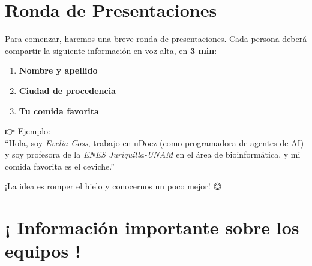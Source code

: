 \documentclass[
  spanish,
  12pt,
  letterpaper,
  DIV=11,
  numbers=noendperiod]{scrreprt}
\begin{document}
\section{Ronda de Presentaciones}\label{ronda-de-presentaciones}

\begin{tcolorbox}[enhanced jigsaw, arc=.35mm, bottomrule=.15mm, bottomtitle=1mm, breakable, colback=white, colbacktitle=quarto-callout-note-color!10!white, colframe=quarto-callout-note-color-frame, coltitle=black, left=2mm, leftrule=.75mm, opacityback=0, opacitybacktitle=0.6, rightrule=.15mm, title={Actividad: ¡Preséntate!}, titlerule=0mm, toprule=.15mm, toptitle=1mm]

Para comenzar, haremos una breve ronda de presentaciones. Cada persona
deberá compartir la siguiente información en voz alta, en \textbf{3
min}:

\begin{enumerate}
\def\labelenumi{\arabic{enumi}.}
\item
  \textbf{Nombre y apellido}
\item
  \textbf{Ciudad de procedencia}
\item
  \textbf{Tu comida favorita 🍕🍜🍫}
\end{enumerate}

👉 Ejemplo:\\
``Hola, soy \emph{Evelia Coss}, trabajo en uDocz (como programadora de
agentes de AI) y soy profesora de la \emph{ENES Juriquilla-UNAM} en el
área de bioinformática, y mi comida favorita es el ceviche.''

¡La idea es romper el hielo y conocernos un poco mejor! 😊

\end{tcolorbox}

\section{¡ Información importante sobre los equipos
!}\label{informaciuxf3n-importante-sobre-los-equipos}
\end{document}
